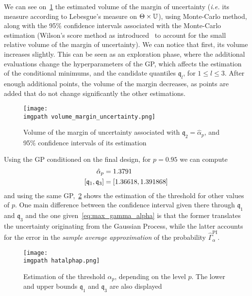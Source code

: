 \documentclass[../../Main_ManuscritThese.tex]{subfiles}
\newcommand\imgpath{/home/victor/acadwriting/Manuscrit/Text/Chapter5/img/}
\begin{document}
We can see on~\cref{fig:vol_Meta} the estimated volume of the margin
of uncertainty (\emph{i.e.} its measure according to Lebesgue's
measure on $\Theta \times \mathbb{U}$), using Monte-Carlo method, along
with the 95\% confidence intervals associated with the Monte-Carlo
estimation (Wilson's score method as
introduced~\cite{wilson_probable_1927} to account for the small
relative volume of the margin of uncertainty).  We can notice that
first, its volume increases slightly. This can be seen as an
exploration phase, where the additional evaluations change the
hyperparameters of the GP, which affects the estimation of the
conditional minimums, and the candidate quantiles $\mathfrak{q}_l$,
for $1\leq l \leq 3$. After enough additional points, the volume of
the margin decreases, as points are added that do not change
significantly the other estimations.

\begin{figure}[ht]
  \centering
  \texttt{[image: \\imgpath volume\_margin\_uncertainty.png]}
  \caption[Volume of the margin of uncertainty associated with
  $\mathfrak{q}_2 = \hat{\alpha}_p$]{\label{fig:vol_Meta} Volume of
    the margin of uncertainty associated with
    $\mathfrak{q}_2 = \hat{\alpha}_p$, and 95\% confidence intervals
    of its estimation}
\end{figure}


Using the GP conditioned on the final design, for $p=0.95$ we can compute
\begin{align}
  \hat{\alpha}_p &= \num{1.3791} \\
  \interval{\mathfrak{q}_1}{\mathfrak{q}_3} &= \interval{1.36618}{1.391868} \nonumber
\end{align}
and using the same GP,~\cref{fig:hat_alpha_p} shows the estimation of
the threshold for other values of $p$.  One main difference between
the confidence interval given there through $\mathfrak{q}_1$ and
$\mathfrak{q}_3$ and the one given~\cref{eq:max_gamma_alpha} is that
the former translates the uncertainty originating from the Gaussian
Process, while the latter accounts for the error in the \emph{sample
  average approximation} of the probability
$\hat{\Gamma}_{\alpha}^{\mathrm{PI}}$.
\begin{figure}[ht]
  \centering
  \texttt{[image: \\imgpath hatalphap.png]}
  \caption[Estimation of the threshold $\alpha_p$, depending on the
  level $p$]{\label{fig:hat_alpha_p} Estimation of the threshold
    $\alpha_p$, depending on the level $p$. The lower and upper bounds
    $\mathfrak{q}_1$ and $\mathfrak{q}_3$ are also displayed}
\end{figure}
\end{document}

